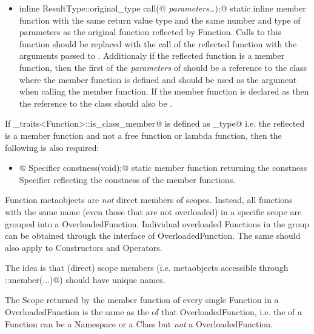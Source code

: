\begin{itemize}
	\item{\verb@static inline ResultType::original_type call(@ {\em parameters\dots}\verb@);@}
	static inline member function with the same return value type and the same number
	and type of parameters as the original function reflected by {\metaobject Function}.
	Calls to this function should be replaced with the call of the reflected function
	with the arguments passed to \verb@call@. Additionaly if the reflected function is
	a member function, then the first of the {\em parameters} of \verb@call@ should be
	a reference to the class where the member function is defined and should be used
	as the \verb@this@ argument when calling the member function. If the member function
	is declared as \verb@const@ then the reference to the class should also be \verb@const@.
\end{itemize}

If \verb@metaobject_traits<Function>::is_class_member@ is defined as \verb@true_type@
i.e. the reflected is a member function and not a free function or lambda function,
then the following is also required:

\begin{itemize}
	\item{\verb@static @ {\metaobject Specifier} \verb@ constness(void);@} static member function
	returning  the constness {\metaobject Specifier} reflecting the constness
	of the member functions.
\end{itemize}

{\metaobject Function} metaobjects are {\em not} direct members of scopes. Instead,
all functions with the same name (even those that are not overloaded) in a specific scope
are grouped into a {\metaobject OverloadedFunction}. Individual overloaded {\metaobject Function}s
in the group can be obtained through the interface of {\metaobject OverloadedFunction}.
The same should also apply to {\metaobject Constructor}s and {\metaobject Operator}s.

The idea is that (direct) scope members (i.e. metaobjects accessible through \verb@Scope::member(...)@)
should have unique names.

The {\metaobject Scope} returned by the \verb@scope@ member function of every single
{\metaobject Function} in a {\metaobject OverloadedFunction}
is the same as the \verb@scope@ of that {\metaobject OverloadedFunction}, i.e.
the \verb@scope@ of a {\metaobject Function} can be a {\metaobject Namespace} or a {\metaobject Class}
but {\em not} a {\metaobject OverloadedFunction}.

